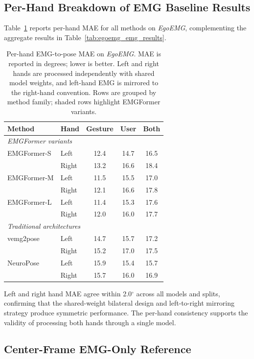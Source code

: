 \documentclass{article}
\newcommand{\dataset}{\textit{EgoEMG}}
\newcommand{\model}{EMGFormer}
\begin{document}
\subsection{Per-Hand Breakdown of EMG Baseline Results}
\label{app:emg_per_hand}
Table~\ref{tab:emg_per_hand} reports per-hand MAE for all methods on \dataset{}, complementing the aggregate results in Table~\ref{tab:egoemg_emg_results}.

\begin{table}[h]
\centering
\caption{Per-hand EMG-to-pose MAE on \dataset{}. MAE is reported in degrees; lower is better. Left and right hands are processed independently with shared model weights, and left-hand EMG is mirrored to the right-hand convention. Rows are grouped by method family; shaded rows highlight \model{} variants.}
\label{tab:emg_per_hand}
\footnotesize
\setlength{\tabcolsep}{3.8pt}
\renewcommand{\arraystretch}{1.08}
\begin{tabular}{llccc}
\toprule
Method & Hand & Gesture & User & Both \\
\midrule
\multicolumn{5}{l}{\textit{\model{} variants}} \\
\midrule
\model{}-S & Left & 12.4 & 14.7 & 16.5 \\
 & Right & 13.2 & 16.6 & 18.4 \\
\midrule
\model{}-M & Left & 11.5 & 15.5 & 17.0 \\
 & Right & 12.1 & 16.6 & 17.8 \\
\midrule
\model{}-L & Left & 11.4 & 15.3 & 17.6 \\
 & Right & 12.0 & 16.0 & 17.7 \\
\midrule
\multicolumn{5}{l}{\textit{Traditional architectures}} \\
\midrule
vemg2pose & Left & 14.7 & 15.7 & 17.2 \\
 & Right & 15.2 & 17.0 & 17.5 \\
\midrule
NeuroPose & Left & 15.9 & 15.4 & 15.7 \\
 & Right & 15.7 & 16.0 & 16.9 \\
\bottomrule
\end{tabular}
\end{table}

Left and right hand MAE agree within 2.0$^\circ$ across all models and splits, confirming that the shared-weight bilateral design and left-to-right mirroring strategy produce symmetric performance. The per-hand consistency supports the validity of processing both hands through a single model.

\subsection{Center-Frame EMG-Only Reference}
\label{app:center_frame_emg}
\end{document}
